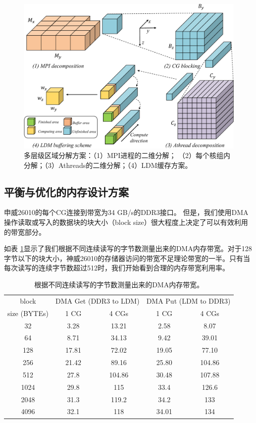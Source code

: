 \documentclass[degree=doctor]{thuthesis}
\begin{document}
\begin{figure}[h]
\centering
\includegraphics[width=0.9\columnwidth]{blocking.pdf}
\caption{多层级区域分解方案：（1）MPI进程的二维分解； （2）每个核组内分解；（3）Athreads的二维分解；（4）LDM缓存方案。}
\label{fig:dd}
\end{figure}

\subsection{平衡与优化的内存设计方案}
\label{sec:mem-redesign}

申威26010的每个CG连接到带宽为34 GB/s的DDR3接口。 但是，我们使用DMA操作读取或写入的数据块的块大小（block size）很大程度上决定了可以有效利用的带宽部分。

如表 \ref{tb:sw-bw}显示了我们根据不同连续读写的字节数测量出来的DMA内存带宽。对于128字节以下的块大小，神威26010的存储器访问的带宽不足理论带宽的一半。只有当每次读写的连续字节数超过512时，我们开始看到合理的内存带宽利用率。

\begin{table}[!t]
\small
\caption{根据不同连续读写的字节数测量出来的DMA内存带宽。}
\label{tb:sw-bw}
\centering
\begin{tabular}{ccccc}
\hline\hline
  block & \multicolumn{2}{c}{DMA Get (DDR3 to LDM)} & \multicolumn{2}{c}{DMA Put (LDM to DDR3)} \\
  size (BYTEs) & 1 CG & 4 CGs & 1 CG & 4 CGs \\\hline
  32 & 3.28 & 13.21 & 2.58 & 8.07 \\
  64 & 8.71 & 34.13 & 9.42 & 39.01 \\
  128 & 17.81 & 72.02 & 19.05 & 77.10 \\
  256 & 21.42 & 89.16 & 25.80 & 104.86 \\
  512 & 27.8 & 104.86 & 30.48 & 107.88 \\
  1024 & 29.8 & 115 & 33.4 & 126.6 \\
  2048 & 31.3 & 119.2 & 34.2 & 133 \\
  4096 & 32.1 & 118 & 34.01 & 134 \\
  \hline
\end{tabular}
\end{table}
\end{document}
